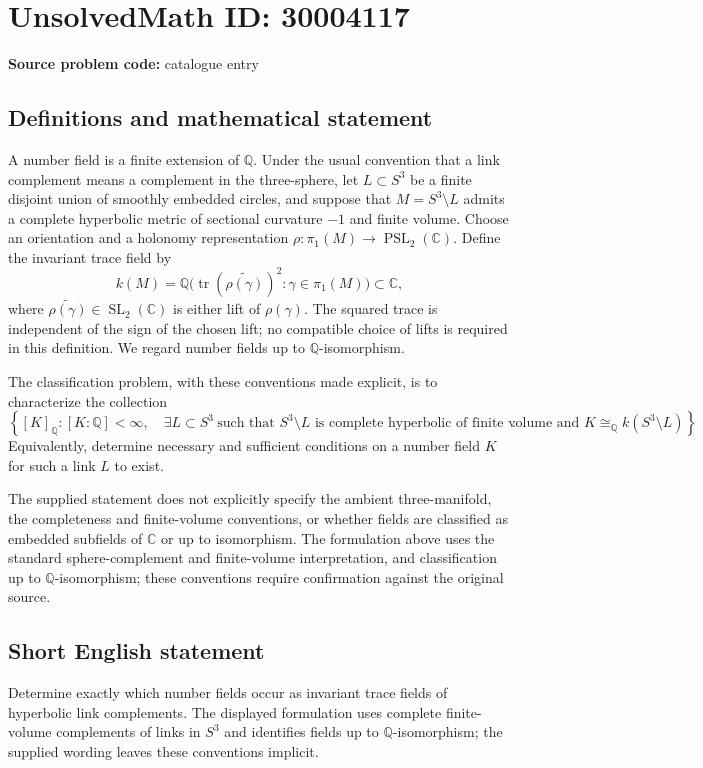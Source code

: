 \documentclass[11pt]{article}
\newcommand{\Q}{\mathbb{Q}}
\newcommand{\C}{\mathbb{C}}
\begin{document}
\section*{UnsolvedMath ID: 30004117}
\textbf{Source problem code:} catalogue entry
\subsection{Definitions and mathematical statement}
A number field is a finite extension of \(\Q\). Under the usual convention that a link complement means a complement in the three-sphere, let \(L\subset S^3\) be a finite disjoint union of smoothly embedded circles, and suppose that \(M=S^3\setminus L\) admits a complete hyperbolic metric of sectional curvature \(-1\) and finite volume. Choose an orientation and a holonomy representation \(\rho:\pi_1(M)\to\operatorname{PSL}_2(\C)\). Define the invariant trace field by
\[
k(M)=\Q\bigl(\operatorname{tr}(\widetilde{\rho(\gamma)})^2:\gamma\in\pi_1(M)\bigr)\subset\C,
\]
where \(\widetilde{\rho(\gamma)}\in\operatorname{SL}_2(\C)\) is either lift of \(\rho(\gamma)\). The squared trace is independent of the sign of the chosen lift; no compatible choice of lifts is required in this definition. We regard number fields up to \(\Q\)-isomorphism.

The classification problem, with these conventions made explicit, is to characterize the collection
\[
\left\{[K]_{\Q}: [K:\Q]<\infty,\quad \exists L\subset S^3\ \text{such that }S^3\setminus L\text{ is complete hyperbolic of finite volume and }K\cong_{\Q}k(S^3\setminus L)\right\}.
\]
Equivalently, determine necessary and sufficient conditions on a number field \(K\) for such a link \(L\) to exist.

The supplied statement does not explicitly specify the ambient three-manifold, the completeness and finite-volume conventions, or whether fields are classified as embedded subfields of \(\C\) or up to isomorphism. The formulation above uses the standard sphere-complement and finite-volume interpretation, and classification up to \(\Q\)-isomorphism; these conventions require confirmation against the original source.
\subsection{Short English statement}
Determine exactly which number fields occur as invariant trace fields of hyperbolic link complements. The displayed formulation uses complete finite-volume complements of links in \(S^3\) and identifies fields up to \(\Q\)-isomorphism; the supplied wording leaves these conventions implicit.
\end{document}
